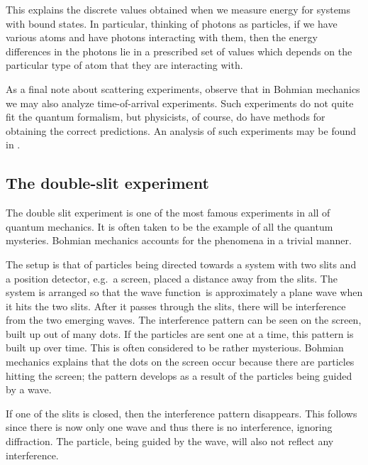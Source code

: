 \documentclass[11pt]{article}
\theoremstyle{remark}
\begin{document}
This explains the
 discrete values obtained when we measure energy for systems with bound
 states. In particular, thinking of photons as particles, if we have
 various atoms and have photons interacting with them, then 
 the energy differences in the photons lie in a prescribed set of values
 which depends on the particular type of atom that they are interacting
 with.


As a final note about scattering experiments, observe that in Bohmian
mechanics we may also analyze time-of-arrival experiments. Such
experiments do not quite fit the quantum formalism, but physicists, of
course, do
have methods for obtaining the correct predictions.
An analysis of such
experiments may be found in \cite{DGTeZ00}.

\subsection{The double-slit experiment}


The double slit experiment is one of the most famous experiments in
all of quantum mechanics. It is often taken to be the example of all
the quantum mysteries. Bohmian mechanics accounts for the phenomena in a
trivial manner.

The setup is that of particles being directed towards a system with
two slits and a position detector, e.g.\ a screen,  
placed a distance away from the
slits. The system is arranged so that the wave function\ is approximately a plane
wave when it hits the two slits. After it passes through the slits,
there will be interference from the two emerging waves. The interference
pattern can be seen on the screen, built up out of many dots. 
If the particles are sent one at a
time, this pattern is built up over time. This is often considered to be
rather mysterious. Bohmian mechanics explains
that the dots on the screen occur because there are particles hitting
the screen; the pattern develops as a result of  the
particles being guided by a wave. 

If one of the slits is closed, then the interference pattern
disappears. This follows since there is now only one wave and thus
there is no interference, ignoring diffraction. The particle, being
guided by the wave, will also not reflect any interference. 
\end{document}
